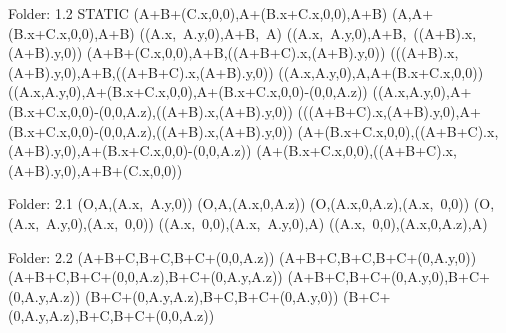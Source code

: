 Folder: 1.2 STATIC
\left(A+B+\left(C.x,0,0\right),A+\left(B.x+C.x,0,0\right),A+B\right)
\left(A,A+\left(B.x+C.x,0,0\right),A+B\right)
\left(\left(A.x,\ A.y,0\right),A+B,\ A\right)
\left(\left(A.x,\ A.y,0\right),A+B,\ \left(\left(A+B\right).x,\left(A+B\right).y,0\right)\right)
\left(A+B+\left(C.x,0,0\right),A+B,\left(\left(A+B+C\right).x,\left(A+B\right).y,0\right)\right)
\left(\left(\left(A+B\right).x,\left(A+B\right).y,0\right),A+B,\left(\left(A+B+C\right).x,\left(A+B\right).y,0\right)\right)
\left(\left(A.x,A.y,0\right),A,A+\left(B.x+C.x,0,0\right)\right)
\left(\left(A.x,A.y,0\right),A+\left(B.x+C.x,0,0\right),A+\left(B.x+C.x,0,0\right)-\left(0,0,A.z\right)\right)
\left(\left(A.x,A.y,0\right),A+\left(B.x+C.x,0,0\right)-\left(0,0,A.z\right),\left(\left(A+B\right).x,\left(A+B\right).y,0\right)\right)
\left(\left(\left(A+B+C\right).x,\left(A+B\right).y,0\right),A+\left(B.x+C.x,0,0\right)-\left(0,0,A.z\right),\left(\left(A+B\right).x,\left(A+B\right).y,0\right)\right)
\left(A+\left(B.x+C.x,0,0\right),\left(\left(A+B+C\right).x,\left(A+B\right).y,0\right),A+\left(B.x+C.x,0,0\right)-\left(0,0,A.z\right)\right)
\left(A+\left(B.x+C.x,0,0\right),\left(\left(A+B+C\right).x,\left(A+B\right).y,0\right),A+B+\left(C.x,0,0\right)\right)


Folder: 2.1
\left(O,A,\left(A.x,\ A.y,0\right)\right)
\left(O,A,\left(A.x,0,A.z\right)\right)
\left(O,\left(A.x,0,A.z\right),\left(A.x,\ 0,0\right)\right)
\left(O,\left(A.x,\ A.y,0\right),\left(A.x,\ 0,0\right)\right)
\left(\left(A.x,\ 0,0\right),\left(A.x,\ A.y,0\right),A\right)
\left(\left(A.x,\ 0,0\right),\left(A.x,0,A.z\right),A\right)


Folder: 2.2
\left(A+B+C,B+C,B+C+\left(0,0,A.z\right)\right)
\left(A+B+C,B+C,B+C+\left(0,A.y,0\right)\right)
\left(A+B+C,B+C+\left(0,0,A.z\right),B+C+\left(0,A.y,A.z\right)\right)
\left(A+B+C,B+C+\left(0,A.y,0\right),B+C+\left(0,A.y,A.z\right)\right)
\left(B+C+\left(0,A.y,A.z\right),B+C,B+C+\left(0,A.y,0\right)\right)
\left(B+C+\left(0,A.y,A.z\right),B+C,B+C+\left(0,0,A.z\right)\right)



